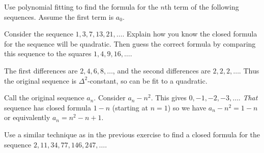 \begin{questions}



\question Use polynomial fitting to find the formula for the $n$th term of the following sequences.  Assume the first term is $a_0$.

	\begin{answer}
	\end{answer}



\question Consider the sequence $ 1, 3, 7, 13, 21, \ldots$.  Explain how you know the closed formula for the sequence will be quadratic.  Then guess the correct formula by comparing this sequence to the squares $1, 4, 9, 16, \ldots$.

	\begin{answer}
		The first differences are $2, 4, 6, 8, \ldots$, and the second differences are $2, 2, 2, \ldots$.  Thus the original sequence is $\Delta^2$-constant, so can be fit to a quadratic.

		Call the original sequence $a_n$.  Consider $a_n - n^2$. This gives $0, -1, -2, -3, \ldots$.  \emph{That} sequence has closed formula $1-n$ (starting at $n = 1$) so we have $a_n - n^2 = 1-n$ or equivalently $a_n = n^2 - n + 1$.
	\end{answer}


\question Use a similar technique as in the previous exercise to find a closed formula for the sequence $2, 11, 34, 77, 146, 247,\ldots$.


\end{questions}
